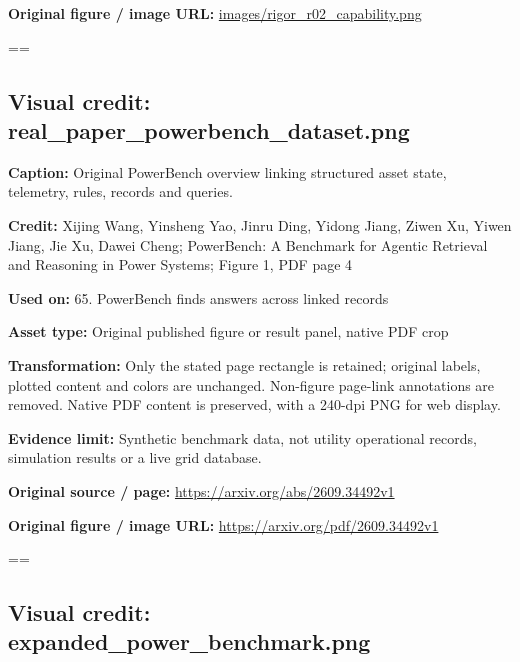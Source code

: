 \documentclass[10pt,letterpaper]{article}
\begin{document}
\textbf{Original figure / image URL:} \href{images/rigor_r02_capability.png}{\small\ttfamily images/\allowbreak{}rigor\_\allowbreak{}r02\_\allowbreak{}capability.\allowbreak{}png}\par
\egroup\par\noindent\box\readingEntry\par\medskip
\setbox\readingEntry=\vbox\bgroup\hsize=\linewidth\subsection*{Visual credit: real\_paper\_powerbench\_dataset.png}
\textbf{Caption:} Original PowerBench overview linking structured asset state, telemetry, rules, records and queries.\par
\textbf{Credit:} Xijing Wang, Yinsheng Yao, Jinru Ding, Yidong Jiang, Ziwen Xu, Yiwen Jiang, Jie Xu, Dawei Cheng; PowerBench: A Benchmark for Agentic Retrieval and Reasoning in Power Systems; Figure 1, PDF page 4\par
\textbf{Used on:} 65. PowerBench finds answers across linked records\par
\textbf{Asset type:} Original published figure or result panel, native PDF crop\par
\textbf{Transformation:} Only the stated page rectangle is retained; original labels, plotted content and colors are unchanged. Non-figure page-link annotations are removed. Native PDF content is preserved, with a 240-dpi PNG for web display.\par
\textbf{Evidence limit:} Synthetic benchmark data, not utility operational records, simulation results or a live grid database.\par
\textbf{Original source / page:} \href{https://arxiv.org/abs/2609.34492v1}{\small\ttfamily https:/\allowbreak{}/\allowbreak{}arxiv.\allowbreak{}org/\allowbreak{}abs/\allowbreak{}2609.\allowbreak{}34492v1}\par
\textbf{Original figure / image URL:} \href{https://arxiv.org/pdf/2609.34492v1}{\small\ttfamily https:/\allowbreak{}/\allowbreak{}arxiv.\allowbreak{}org/\allowbreak{}pdf/\allowbreak{}2609.\allowbreak{}34492v1}\par
\egroup\par\noindent\box\readingEntry\par\medskip
\setbox\readingEntry=\vbox\bgroup\hsize=\linewidth\subsection*{Visual credit: expanded\_power\_benchmark.png}
\end{document}
